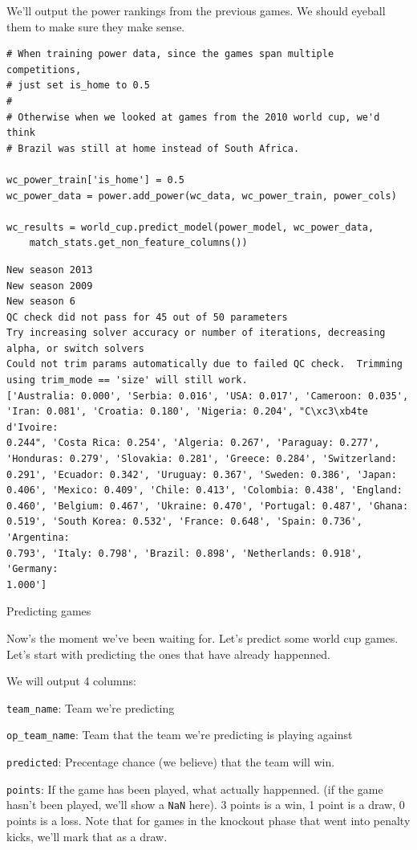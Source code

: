 \documentclass[12pt,fleqn]{article}\usepackage{../common}
\begin{document}
We'll output the power rankings from the previous games. We should eyeball
them to make sure they make sense.

\begin{verbatim}
# When training power data, since the games span multiple competitions, 
# just set is_home to 0.5
#
# Otherwise when we looked at games from the 2010 world cup, we'd think 
# Brazil was still at home instead of South Africa.

wc_power_train['is_home'] = 0.5
wc_power_data = power.add_power(wc_data, wc_power_train, power_cols)

wc_results = world_cup.predict_model(power_model, wc_power_data, 
    match_stats.get_non_feature_columns())
\end{verbatim}

\begin{verbatim}
New season 2013
New season 2009
New season 6
QC check did not pass for 45 out of 50 parameters
Try increasing solver accuracy or number of iterations, decreasing alpha, or switch solvers
Could not trim params automatically due to failed QC check.  Trimming using trim_mode == 'size' will still work.
['Australia: 0.000', 'Serbia: 0.016', 'USA: 0.017', 'Cameroon: 0.035',
'Iran: 0.081', 'Croatia: 0.180', 'Nigeria: 0.204', "C\xc3\xb4te d'Ivoire:
0.244", 'Costa Rica: 0.254', 'Algeria: 0.267', 'Paraguay: 0.277',
'Honduras: 0.279', 'Slovakia: 0.281', 'Greece: 0.284', 'Switzerland:
0.291', 'Ecuador: 0.342', 'Uruguay: 0.367', 'Sweden: 0.386', 'Japan:
0.406', 'Mexico: 0.409', 'Chile: 0.413', 'Colombia: 0.438', 'England:
0.460', 'Belgium: 0.467', 'Ukraine: 0.470', 'Portugal: 0.487', 'Ghana:
0.519', 'South Korea: 0.532', 'France: 0.648', 'Spain: 0.736', 'Argentina:
0.793', 'Italy: 0.798', 'Brazil: 0.898', 'Netherlands: 0.918', 'Germany:
1.000'] 
\end{verbatim}


Predicting games

Now's the moment we've been waiting for. Let's predict some world cup games. Let's start with predicting the ones that have already happenned.

We will output 4 columns:

\verb!team_name!: Team we're predicting

\verb!op_team_name!: Team that the team we're predicting is playing against

\verb!predicted!: Precentage chance (we believe) that the team will win.

\verb!points!: If the game has been played, what actually happenned. (if
the game hasn't been played, we'll show a \verb!NaN! here). 3 points is a
win, 1 point is a draw, 0 points is a loss. Note that for games in the
knockout phase that went into penalty kicks, we'll mark that as a draw.
\end{document}

